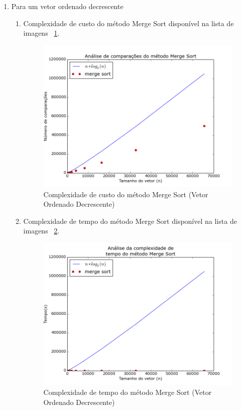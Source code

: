 \documentclass[12pt,a4paper,twoside]{report}
\begin{document}
\begin{enumerate}
\begin{enumerate}
		\end{enumerate}



		\item Para um vetor ordenado decrescente
				\begin{enumerate}
					\item Complexidade de custo do método Merge Sort disponível na lista de imagens ~\ref{fig:MergePlot1OD}.
					\begin{figure}[!h]
						\centering
						\includegraphics[scale=0.6]{../imagens/Merge/merge_plot_1_ordenado_decrescente.png}
						\caption{Complexidade de custo do método Merge Sort (Vetor Ordenado Decrescente) \label{fig:MergePlot1OD}}
					\end{figure}


					\item Complexidade de tempo do método Merge Sort disponível na lista de imagens ~\ref{fig:MergePlot2OD}.
					\begin{figure}[!h]
						\centering
						\includegraphics[scale=0.6]{../imagens/Merge/merge_plot_2_ordenado_decrescente.png}
						\caption{Complexidade de tempo do método Merge Sort (Vetor Ordenado Decrescente) \label{fig:MergePlot2OD}}
					\end{figure}



\end{enumerate}
\end{enumerate}
\end{document}
